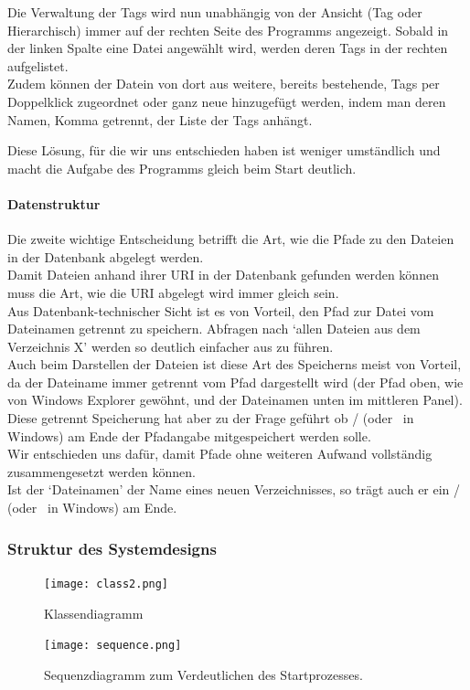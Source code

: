 \documentclass[10pt,paper=a4,final]{scrartcl}
\begin{document}
Die Verwaltung der Tags wird nun unabh\"angig von der Ansicht (Tag oder Hierarchisch) immer auf der rechten Seite des Programms angezeigt. Sobald in der linken Spalte eine Datei angew\"ahlt wird, werden deren Tags in der rechten aufgelistet.\\
Zudem k\"onnen der Datein von dort aus weitere, bereits bestehende, Tags per Doppelklick zugeordnet oder ganz neue hinzugef\"ugt werden, indem man deren Namen, Komma getrennt, der Liste der Tags anh\"angt.

Diese L\"osung, f\"ur die wir uns entschieden haben ist weniger umst\"andlich und macht die Aufgabe des Programms gleich beim Start deutlich.
\paragraph{Datenstruktur}
Die zweite wichtige Entscheidung betrifft die Art, wie die Pfade zu den Dateien in der Datenbank abgelegt werden.\\
Damit Dateien anhand ihrer URI in der Datenbank gefunden werden k\"onnen muss die Art, wie die URI abgelegt wird immer gleich sein.\\
Aus Datenbank-technischer Sicht ist es von Vorteil, den Pfad zur Datei vom Dateinamen getrennt zu speichern. Abfragen nach ‘allen Dateien aus dem Verzeichnis X’ werden so deutlich einfacher aus zu f\"uhren.\\
Auch beim Darstellen der Dateien ist diese Art des Speicherns meist von Vorteil, da der Dateiname immer getrennt vom Pfad dargestellt wird (der Pfad oben, wie von Windows Explorer gew\"ohnt, und der Dateinamen unten im mittleren Panel).\\
Diese getrennt Speicherung hat aber zu der Frage gef\"uhrt ob / (oder \ in Windows) am Ende der Pfadangabe mitgespeichert werden solle.\\
Wir entschieden uns daf\"ur, damit Pfade ohne weiteren Aufwand vollst\"andig zusammengesetzt werden k\"onnen.\\
Ist der ‘Dateinamen’ der Name eines neuen Verzeichnisses, so tr\"agt auch er ein / (oder \ in Windows) am Ende.
\newpage
\subsubsection{Struktur des Systemdesigns}
\begin{figure}[h!]
\texttt{[image: class2.png]}
\caption{Klassendiagramm}
\end{figure}
\newpage
\begin{landscape}
\begin{figure}[h!]
\texttt{[image: sequence.png]}
\caption{Sequenzdiagramm zum Verdeutlichen des Startprozesses.}
\end{figure}
\end{landscape}
\newpage
\end{document}
